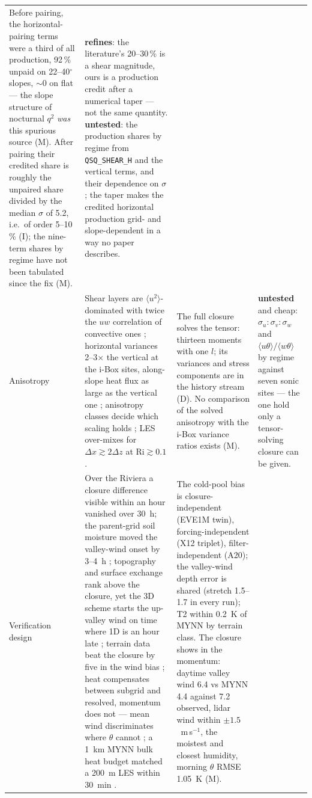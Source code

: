 \documentclass[10pt,a4paper]{article}
\newcommand{\avg}[1]{\langle #1 \rangle}
\newcommand{\dx}{\Delta x}
\newcommand{\qsq}{q^2}
\newcommand{\Ri}{\mathrm{Ri}}
\newcommand{\untested}{\textcolor{orange!70!black}{\textbf{untested}}}
\newcommand{\refines}{\textcolor{blue!60!black}{\textbf{refines}}}
\begin{document}
\begin{landscape}
\begin{xltabular}{\linewidth}{@{}>{\raggedright\arraybackslash}p{2.2cm}
  >{\raggedright\arraybackslash}X >{\raggedright\arraybackslash}X >{\raggedright\arraybackslash}p{5.0cm}@{}}
Before pairing, the horizontal-pairing terms were a third of all production, 92\,\% unpaid on 22--40$^\circ$ slopes, $\sim$0 on flat --- the slope structure of nocturnal $\qsq$ \emph{was} this spurious source (M). After pairing their credited share is roughly the unpaired share divided by the median $\sigma$ of 5.2, i.e.\ of order 5--10\,\% (I); the nine-term shares by regime have not been tabulated since the fix (M). &
\refines{}: the literature's 20--30\,\% is a shear magnitude, ours is a production credit after a numerical taper --- not the same quantity. \untested{}: the production shares by regime from \texttt{QSQ\_SHEAR\_H} and the vertical terms, and their dependence on $\sigma$; the taper makes the credited horizontal production grid- and slope-dependent in a way no paper describes. \\
\addlinespace[3pt]
Anisotropy &
Shear layers are $\avg{u^2}$-dominated with twice the $uw$ correlation of convective ones \parencite{moeng1994}; horizontal variances 2--3$\times$ the vertical at the i-Box sites, along-slope heat flux as large as the vertical one \parencite{lehner2021}; anisotropy classes decide which scaling holds \parencite{stiperski2017}; LES over-mixes for $\dx \gtrsim 2\Delta z$ at $\Ri \gtrsim 0.1$ \parencite{deroode2017}. &
The full closure solves the tensor: thirteen moments with one $l$; its variances and stress components are in the history stream (D). No comparison of the solved anisotropy with the i-Box variance ratios exists (M). &
\untested{} and cheap: $\sigma_u\!:\!\sigma_v\!:\!\sigma_w$ and $\avg{u\theta}/\avg{w\theta}$ by regime against seven sonic sites --- the one hold only a tensor-solving closure can be given. \\
\addlinespace[3pt]
Verification design &
Over the Riviera a closure difference visible within an hour vanished over 30~h; the parent-grid soil moisture moved the valley-wind onset by 3--4~h \parencite{chow2006}; topography and surface exchange rank above the closure, yet the 3D scheme starts the up-valley wind on time where 1D is an hour late \parencite{goger2024}; terrain data beat the closure by five in the wind bias \parencite{liu2020}; heat compensates between subgrid and resolved, momentum does not --- mean wind discriminates where $\theta$ cannot \parencite{shin2016}; a 1~km MYNN bulk heat budget matched a 200~m LES within 30~min \parencite{leukauf2015}. &
The cold-pool bias is closure-independent (EVE1M twin), forcing-independent (X12 triplet), filter-independent (A20); the valley-wind depth error is shared (stretch 1.5--1.7 in every run); T2 within 0.2~K of MYNN by terrain class. The closure shows in the momentum: daytime valley wind 6.4 vs MYNN 4.4 against 7.2 observed, lidar wind within $\pm 1.5$~m\,s$^{-1}$, the moistest and closest humidity, morning $\theta$ RMSE 1.05~K (M). &

\end{xltabular}
\end{landscape}
\end{document}
